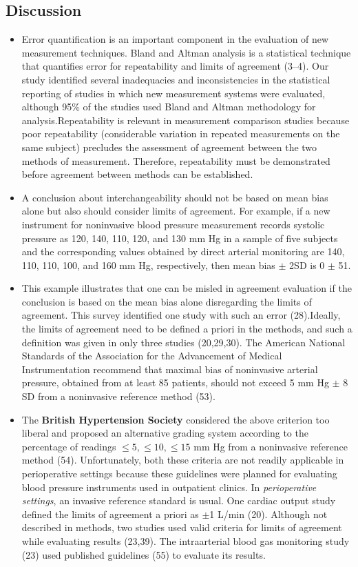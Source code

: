 \documentclass[]{article}
\begin{document}
	\subsection*{Discussion}
	\begin{itemize}
		\item 
		Error quantification is an important component in the evaluation of new measurement techniques. Bland and Altman analysis is a statistical technique that quantifies error for repeatability and limits of agreement (3–4). Our study identified several inadequacies and inconsistencies in the statistical reporting of studies in which new measurement systems were evaluated, although 95\% of the studies used Bland and Altman methodology for analysis.Repeatability is relevant in measurement comparison studies because poor repeatability (considerable variation in repeated measurements on the same subject) precludes the assessment of agreement between the two methods of measurement. Therefore, repeatability must be demonstrated before agreement between methods can be established.
		\item 
		A conclusion about interchangeability should not be based on mean bias alone but also should consider limits of agreement. For example, if a new instrument for noninvasive blood pressure measurement records systolic pressure as 120, 140, 110, 120, and 130 mm Hg in a sample of five subjects and the corresponding values obtained by direct arterial monitoring are 140, 110, 110, 100, and 160 mm Hg, respectively, then mean bias $\pm$ 2SD is 0 $\pm$ 51. 
		\item 
		This example illustrates that one can be misled in agreement evaluation if the conclusion is based on the mean bias alone disregarding the limits of agreement. This survey identified one study with such an error (28).Ideally, the limits of agreement need to be defined a priori in the methods, and such a definition was given in only three studies (20,29,30). The American National Standards of the Association for the Advancement of Medical Instrumentation recommend that maximal bias of noninvasive arterial pressure, obtained from at least 85 patients, should not exceed 5 mm Hg $\pm$ 8 SD from a noninvasive reference method (53). 
		\item 
		The \textbf{British Hypertension Society} considered the above criterion too liberal and proposed an alternative grading system according to the percentage of readings $\leq 5, \leq 10, \leq 15$ mm Hg from a noninvasive reference method (54). Unfortunately, both these criteria are not readily applicable in perioperative settings because these guidelines were planned for evaluating blood pressure instruments used in outpatient clinics. In\textit{ perioperative settings}, an invasive reference standard is usual. One cardiac output study defined the limits of agreement a priori as $\pm$1 L/min (20). Although not described in methods, two studies used valid criteria for limits of agreement while evaluating results (23,39). The intraarterial blood gas monitoring study (23) used published guidelines (55) to evaluate its results. 

\end{itemize}
\end{document}
